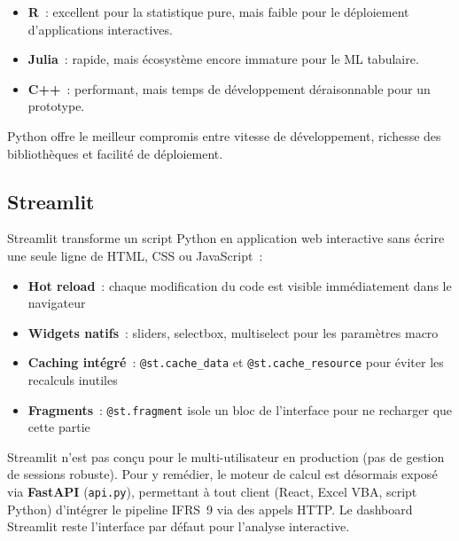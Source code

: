 \documentclass[12pt,a4paper]{article}
\begin{document}
\begin{definitionbox}
\begin{itemize}[noitemsep]
    \item \textbf{R}~: excellent pour la statistique pure, mais faible pour le d\'eploiement d'applications interactives.
    \item \textbf{Julia}~: rapide, mais \'ecosyst\`eme encore immature pour le ML tabulaire.
    \item \textbf{C++}~: performant, mais temps de d\'eveloppement d\'eraisonnable pour un prototype.
\end{itemize}
Python offre le meilleur compromis entre vitesse de d\'eveloppement, richesse des biblioth\`eques et facilit\'e de d\'eploiement.
\end{definitionbox}

\subsection{Streamlit}

Streamlit transforme un script Python en application web interactive sans \'ecrire une seule ligne de HTML, CSS ou JavaScript~:

\begin{itemize}[noitemsep]
    \item \textbf{Hot reload}~: chaque modification du code est visible imm\'ediatement dans le navigateur
    \item \textbf{Widgets natifs}~: sliders, selectbox, multiselect pour les param\`etres macro
    \item \textbf{Caching int\'egr\'e}~: \texttt{@st.cache\_data} et \texttt{@st.cache\_resource} pour \'eviter les recalculs inutiles
    \item \textbf{Fragments}~: \texttt{@st.fragment} isole un bloc de l'interface pour ne recharger que cette partie
\end{itemize}

\begin{warningbox}
Streamlit n'est pas con\c{c}u pour le multi-utilisateur en production (pas de gestion de sessions robuste). Pour y rem\'edier, le moteur de calcul est d\'esormais expos\'e via \textbf{FastAPI} (\texttt{api.py}), permettant \`a tout client (React, Excel VBA, script Python) d'int\'egrer le pipeline IFRS~9 via des appels HTTP. Le dashboard Streamlit reste l'interface par d\'efaut pour l'analyse interactive.
\end{warningbox}
\end{document}
